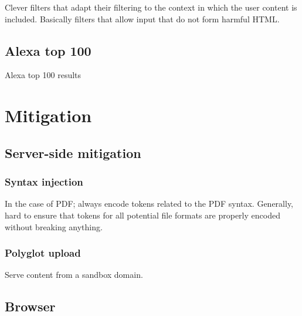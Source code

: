 \documentclass[10pt, conference, compsocconf]{IEEEtran}
\begin{document}
Clever filters that adapt their filtering to the context in which 
the user content is included. Basically filters that allow input 
that do not form harmful HTML. 


\subsection{Alexa top 100}

Alexa top 100 results











\section{Mitigation}


\subsection{Server-side mitigation}


\subsubsection{Syntax injection}

In the case of PDF; always encode tokens related to the PDF 
syntax. Generally, hard to ensure that tokens for all potential 
file formats are properly encoded without breaking anything.


\subsubsection{Polyglot upload}

Serve content from a sandbox domain.


\subsection{Browser}
\end{document}
